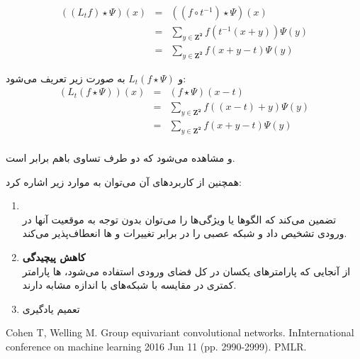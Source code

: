 \begin{qsolve}
	\begin{eqnarray*}
		((L_tf)\star \Psi)(x)&=&((f\circ t^{-1})\star \Psi)(x)\\
		&=&\sum_{y\in \mathbf{Z^2}} f(t^{-1} (x+y))\Psi(y)\\
		&=&\sum_{y\in \mathbf{Z^2}} f(x+y-t)\Psi(y)
	\end{eqnarray*}
	
	و $L_t(f\star \Psi)$ به صورت زیر تعریف می‌شود:
	\begin{eqnarray*}
		(L_t(f \star \Psi))(x)&=&(f\star \Psi)(x-t)\\
		&=&\sum_{y\in \mathbf{Z^2}} f((x-t)+y)\Psi(y)\\
		&=&\sum_{y\in \mathbf{Z^2}} f(x+y-t)\Psi(y)\\
	\end{eqnarray*}
	
	و مشاهده می‌شود که دو طرف تساوی باهم برابر است.
	
	همچنین از کاربردهای آن می‌توان به موارد زیر اشاره کرد:
	
	\begin{enumerate}
		\item {}\\
		تضمین می‌کند که الگوها یا ویژگی‌ها را می‌توان بدون توجه به موقعیت آنها در ورودی تشخیص داد و شبکه عصبی را در برابر تغییرات و  ها انعطاف‌پذیر می‌کند.
		
		
		\item \textbf{کاهش پیچیدگی}\\
		از آنجایی که پارامتر‌های یکسان در کل فضای ورودی استفاده می‌شود،  ها پارامتر کمتری در مقایسه با شبکه‌های  با اندازه مشابه دارند.
		
		\item تعمیم یادگیری
	\end{enumerate}
\end{qsolve}



\begin{latin}
	\begin{thebibliography}{9}
		Cohen T, Welling M. Group equivariant convolutional networks. InInternational conference on machine learning 2016 Jun 11 (pp. 2990-2999). PMLR.
		
	\end{thebibliography} 
\end{latin}